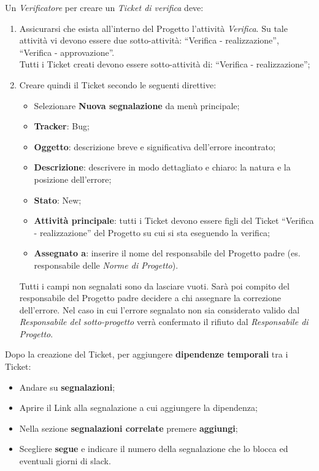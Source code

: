 Un \emph{Verificatore} per creare un \emph{Ticket di verifica} deve: 
\begin{enumerate}
\item Assicurarsi che esista all’interno del Progetto l’attività \emph{Verifica}.
Su tale attività vi devono essere due sotto-attività: “Verifica - realizzazione”, 
“Verifica - approvazione”.\\
Tutti i Ticket creati devono essere sotto-attività di: “Verifica - realizzazione”; 
\item Creare quindi il Ticket secondo le seguenti direttive: 
		\begin{itemize}
		
		
		\item Selezionare \textbf{Nuova segnalazione} da menù principale; 
		\item \textbf{Tracker}: Bug; 
		\item \textbf{Oggetto}: descrizione breve e significativa dell’errore incontrato; 
		\item \textbf{Descrizione}: descrivere in modo dettagliato e chiaro: la natura e la posizione dell’errore; 
		\item \textbf{Stato}: New; 
		\item \textbf{Attività principale}: tutti i Ticket devono essere figli del Ticket “Verifica - realizzazione” del Progetto su cui si sta eseguendo la verifica; 
		\item \textbf{Assegnato a}: inserire il nome del responsabile del Progetto padre (es. 
		responsabile delle \emph{Norme di Progetto}). 
		\end{itemize}
Tutti i campi non segnalati sono da lasciare vuoti. 
Sarà poi compito del responsabile del Progetto padre decidere a chi assegnare la correzione dell’errore. Nel caso in cui l’errore segnalato non sia considerato valido dal 
\emph{Responsabile del sotto-progetto} verrà confermato il rifiuto dal \emph{Responsabile di Progetto}. 

\end{enumerate}




Dopo la creazione del Ticket, per aggiungere \textbf{dipendenze temporali} tra i Ticket:
\begin{itemize}
\item Andare su \textbf{segnalazioni}; 
\item Aprire il Link alla segnalazione a cui aggiungere la dipendenza; 
\item Nella sezione \textbf{segnalazioni correlate} premere \textbf{aggiungi}; 
\item Scegliere \textbf{segue} e indicare il numero della segnalazione che lo blocca ed eventuali giorni di slack. 

\end{itemize} 


